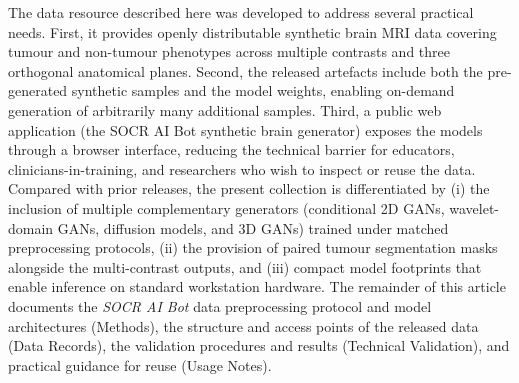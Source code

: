 \documentclass[11pt]{article}
\begin{document}
The data resource described here was developed to address several practical needs. First, it provides openly distributable synthetic brain MRI data covering tumour and non-tumour phenotypes across multiple contrasts and three orthogonal anatomical planes. Second, the released artefacts include both the pre-generated synthetic samples and the model weights, enabling on-demand generation of arbitrarily many additional samples. Third, a public web application (the SOCR AI Bot synthetic brain generator) exposes the models through a browser interface, reducing the technical barrier for educators, clinicians-in-training, and researchers who wish to inspect or reuse the data. Compared with prior releases, the present collection is differentiated by (i) the inclusion of multiple complementary generators (conditional 2D GANs, wavelet-domain GANs, diffusion models, and 3D GANs) trained under matched preprocessing protocols, (ii) the provision of paired tumour segmentation masks alongside the multi-contrast outputs, and (iii) compact model footprints that enable inference on standard workstation hardware. The remainder of this article  documents the \emph{SOCR AI Bot} data preprocessing protocol and model architectures (Methods), the structure and access points of the released data (Data Records), the validation procedures and results (Technical Validation), and practical guidance for reuse (Usage Notes).
\end{document}

